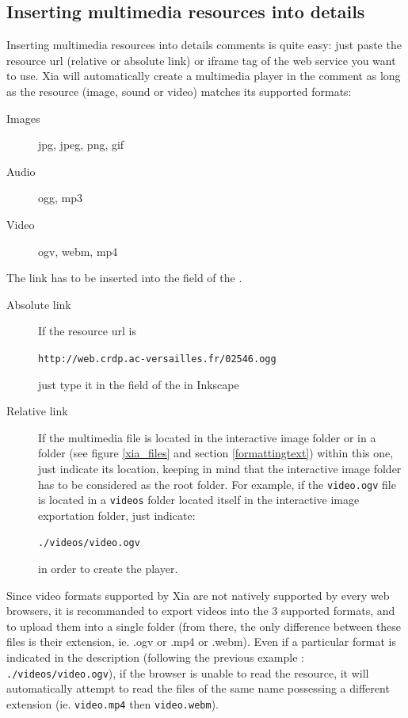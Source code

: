 \subsection{Inserting multimedia resources into details}\label{multimedia_enrichment}

Inserting multimedia resources into details comments is quite easy: just paste 
the resource url (relative or absolute link) or iframe tag of the web service 
you want to use. Xia will automatically create a multimedia player in the comment as long as 
the resource (image, sound or video) matches its supported formats: 
\begin{description}
 \item [Images] jpg, jpeg, png, gif
 \item [Audio] ogg, mp3
 \item [Video] ogv, webm, mp4
\end{description}

The link has to be inserted into the  field of the .

\begin{description}
 \item[Absolute link] If the resource url is
 
 \verb|http://web.crdp.ac-versailles.fr/02546.ogg|
 
 just type it in the  field of the  in 
 Inkscape
 
 \item [Relative link] If the multimedia file is located in the interactive image 
 folder or in a folder (see figure \ref{xia_files} and section \ref{formattingtext}) within this one,
 just indicate its location, keeping in 
 mind that the interactive image folder has to be considered as the root folder. 
 For example, if the \verb|video.ogv| file is located in a \verb|videos| 
 folder located itself in the interactive image exportation folder, just indicate:
 
  \verb|./videos/video.ogv|
 
  in order to create the player.
\end{description}


\begin{tip}
Since video formats supported by Xia are not natively supported by every web 
browsers, it is recommanded to export videos into the 3 supported formats, 
and to upload them into a single folder (from there, the only difference 
between these files is their extension, ie. .ogv or .mp4 or .webm).
Even if a particular format is indicated in the description (following 
the previous example : \verb|./videos/video.ogv|), if the browser is 
unable to read the resource, it will automatically attempt to read the files 
of the same name possessing a different extension (ie. \verb|video.mp4| 
then \verb|video.webm|).
\end{tip}

